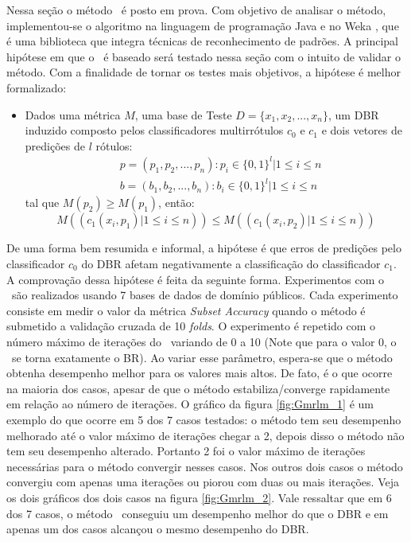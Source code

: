  Nessa seção o método \MRLMa~é posto em prova. Com objetivo de analisar o método, implementou-se o algoritmo
 na linguagem de programação Java e no Weka \cite{weka}, que é uma biblioteca que integra técnicas de reconhecimento de padrões.
 A principal hipótese em que o \MRLMa~é baseado será testado nessa seção com o intuito de validar o método.
 Com a finalidade de tornar os testes mais objetivos, a hipótese é melhor formalizado:
 \begin{itemize}

  \item Dados uma métrica $M$, uma base de Teste $D=\{x_1,x_2,...,x_n\}$,
  um DBR induzido composto pelos classificadores multirrótulos $c_0$ e $c_1$ e
  dois vetores de predições de $l$ rótulos:
  \begin{equation}
  \begin{split}
  & p=(p_1,p_2,...,p_n) : p_i \in {\{0,1\}}^l |1 \leq i \leq n \\
  & b=(b_1,b_2,...,b_n) : b_i \in {\{0,1\}}^l |1 \leq i \leq n
  \end{split}
  \end{equation}
  tal que $M(p_2) \geq M(p_1)$,
  então:
  \begin{equation}
  M((c_1(x_i,p_1) | 1 \leq i \leq n)) \leq M((c_1(x_i,p_2) | 1 \leq i \leq n))
  \end{equation}
 
 \end{itemize}

De uma forma bem resumida e informal, a hipótese é que erros de predições pelo
classificador $c_0$ do DBR afetam negativamente a classificação do classificador $c_1$.
A comprovação dessa hipótese é feita da seguinte forma. Experimentos com o \MRLMa~são realizados
usando 7 bases de dados de domínio públicos. Cada experimento consiste em medir o valor da métrica \textit{Subset Accuracy}
quando o método é submetido a validação cruzada de 10 \textit{folds}.
O experimento é repetido com o número máximo de iterações do
\MRLMa~variando de 0 a 10 (Note que para o valor 0, o \MRLMa~se torna exatamente o BR).
Ao variar esse parâmetro, espera-se que o método obtenha desempenho melhor para os valores mais altos.
De fato, é o que ocorre na maioria dos casos, apesar de que o método estabiliza/converge rapidamente em relação ao
número de iterações.
O gráfico da figura \ref{fig:Gmrlm_1} é um exemplo do que ocorre em 5 dos 7 casos testados: o método tem seu desempenho melhorado
até o valor máximo de iterações chegar a 2, depois disso o método não tem seu desempenho alterado.
Portanto 2 foi o valor máximo de iterações necessárias para o método convergir nesses casos.
Nos outros dois casos o método convergiu com apenas uma iterações ou piorou 
com duas ou mais iterações. Veja os dois gráficos dos dois casos na figura \ref{fig:Gmrlm_2}.
Vale ressaltar que em 6 dos 7 casos, o método \MRLMa~conseguiu um desempenho melhor do que o DBR e em apenas um dos casos
alcançou o mesmo desempenho do DBR.


